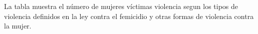 La tabla muestra el número de mujeres víctimas violencia segun los tipos de violencia definidos en la ley contra el femicidio y otras formas de violencia contra la mujer. 
